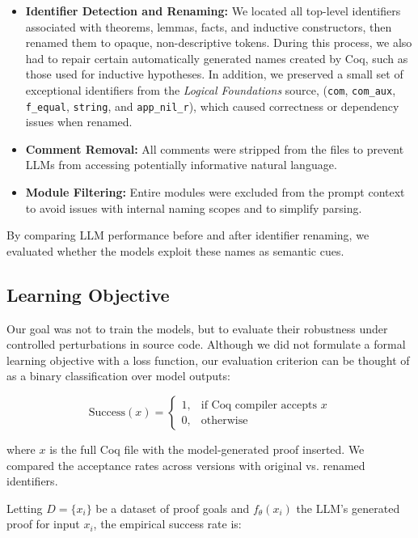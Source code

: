 \begin{itemize}
  \item \textbf{Identifier Detection and Renaming:} We located all top-level identifiers associated with theorems, lemmas, facts, and inductive constructors, then renamed them to opaque, non-descriptive tokens. During this process, we also had to repair certain automatically generated names created by Coq, such as those used for inductive hypotheses. In addition, we preserved a small set of exceptional identifiers from the \textit{Logical Foundations} source, (\texttt{com}, \texttt{com\_aux}, \texttt{f\_equal}, \texttt{string}, and \texttt{app\_nil\_r}), which caused correctness or dependency issues when renamed.
  \item \textbf{Comment Removal:} All comments were stripped from the files to prevent LLMs from accessing potentially informative natural language.
  \item \textbf{Module Filtering:} Entire modules were excluded from the prompt context to avoid issues with internal naming scopes and to simplify parsing.
\end{itemize}

By comparing LLM performance before and after identifier renaming, we evaluated whether the models exploit these names as semantic cues.

\subsection{Learning Objective}

Our goal was not to train the models, but to evaluate their robustness under controlled perturbations in source code. Although we did not formulate a formal learning objective with a loss function, our evaluation criterion can be thought of as a binary classification over model outputs:

\[
\text{Success}(x) =
\begin{cases}
1, & \text{if Coq compiler accepts } x \\
0, & \text{otherwise}
\end{cases}
\]

where \( x \) is the full Coq file with the model-generated proof inserted. We compared the acceptance rates across versions with original vs. renamed identifiers.

Letting \( D = \{x_i\} \) be a dataset of proof goals and \( f_\theta(x_i) \) the LLM's generated proof for input \( x_i \), the empirical success rate is:

